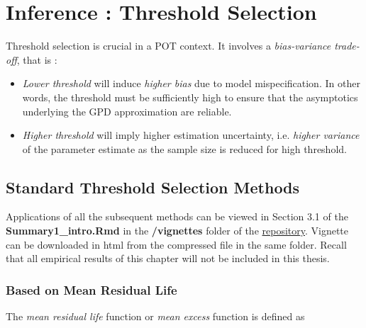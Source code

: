 \section{Inference : Threshold Selection }\label{sec:thresh_selec}

Threshold selection is crucial in a POT context.
It involves a \emph{bias-variance trade-off}, that is :

\begin{itemize}
	\item \emph{Lower threshold} will induce\emph{ higher bias} due to model mispecification. In other words, the threshold must be sufficiently high to ensure that the asymptotics underlying the GPD approximation are reliable.
	
	\item \emph{Higher threshold} will imply higher estimation uncertainty, i.e. \emph{higher variance} of the parameter estimate as the sample size is reduced for high threshold. 
	
\end{itemize}



\subsection{Standard Threshold Selection Methods}


Applications of all the subsequent methods can be viewed in Section 3.1 of the \textbf{Summary1\_intro.Rmd} in the \textbf{/vignettes} folder of the \href{https://github.com/proto4426/PissoortThesis/tree/master/vignettes}{repository}. %
Vignette can be downloaded in html from the compressed file in the same folder. Recall that all empirical results of this chapter will not be included in this thesis.

\subsubsection*{Based on Mean Residual Life}
The \emph{mean residual life} function or \emph{mean excess} function is defined as

